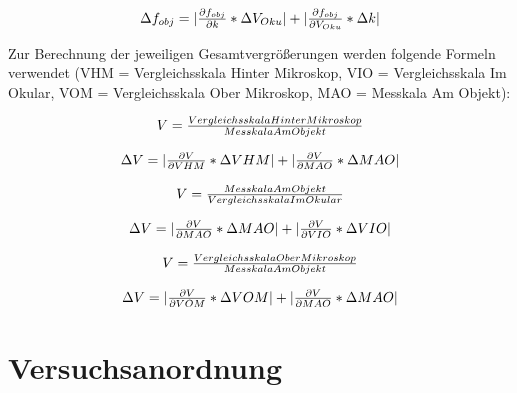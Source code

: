 \documentclass[12pt,a4paper,twoside]{article}
\begin{document}
\begin{equation}
    \label{eq:Unsicherheit_Objektivbrennweite}
    \centerline{$\Delta f_{obj} = \vert \frac{\partial f_{obj}}{\partial k} * \Delta V_{Oku} \vert + \vert \frac{\partial f_{obj}}{\partial V_{Oku}} * \Delta k \vert $}
\end{equation}

\noindent
Zur Berechnung der jeweiligen Gesamtvergrößerungen werden folgende Formeln verwendet (VHM = Vergleichsskala Hinter Mikroskop, VIO = Vergleichsskala Im Okular, VOM = Vergleichsskala Ober Mikroskop, MAO = Messkala Am Objekt):

\begin{equation}
    \label{eq:VergrößerungAM}
    \centerline{$V=\frac{Vergleichsskala Hinter Mikroskop}{Messkala Am Objekt}$}
\end{equation}

\begin{equation}
    \label{eq:Unsicherheit_VergrößerungAM}
    \centerline{$\Delta V = \vert \frac{\partial V}{\partial VHM} * \Delta VHM \vert + \vert \frac{\partial V}{\partial MAO} * \Delta MAO \vert $}
\end{equation}

\begin{equation}
    \label{eq:VergrößerungAM10x}
    \centerline{$V=\frac{Messkala Am Objekt}{Vergleichsskala Im Okular}$}
\end{equation}

\begin{equation}
    \label{eq:Unsicherheit_VergrößerungAM10x}
    \centerline{$\Delta V = \vert \frac{\partial V}{\partial MAO} * \Delta MAO \vert + \vert \frac{\partial V}{\partial VIO} * \Delta VIO \vert $}
\end{equation}

\begin{equation}
    \label{eq:VergrößerungNM}  
    \centerline{$V=\frac{Vergleichsskala Ober Mikroskop}{Messkala Am Objekt}$}
\end{equation}

\begin{equation}
    \label{eq:Unsicherheit_VergrößerungNM}
    \centerline{$\Delta V = \vert \frac{\partial V}{\partial VOM} * \Delta VOM \vert + \vert \frac{\partial V}{\partial MAO} * \Delta MAO \vert $}
\end{equation}



\section{Versuchsanordnung} %
\end{document}
